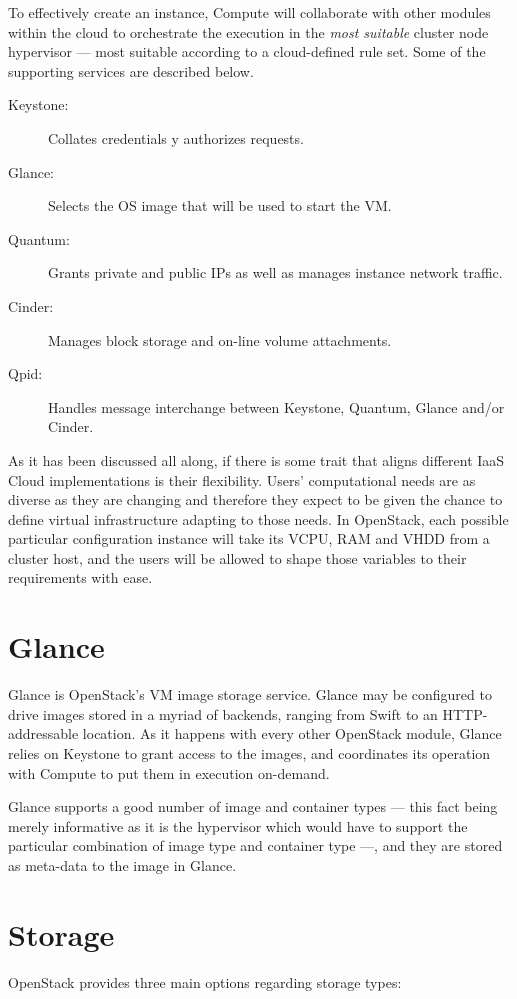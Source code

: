 To effectively create an instance, Compute will collaborate with other modules within the cloud to orchestrate the execution in the \emph{most suitable} cluster node hypervisor --- most suitable according to a cloud-defined rule set. Some of the supporting services are described below.

\begin{description}
 \item[Keystone:] Collates credentials y authorizes requests.
 \item[Glance:] Selects the OS image that will be used to start the VM.
 \item[Quantum:] Grants private and public IPs as well as manages instance network traffic.
 \item[Cinder:] Manages block storage and on-line volume attachments.
 \item[Qpid:] Handles message interchange between Keystone, Quantum, Glance and/or Cinder.
\end{description}

As it has been discussed all along, if there is some trait that aligns different IaaS Cloud implementations is their flexibility. Users' computational needs are as diverse as they are changing and therefore they expect to be given the chance to define virtual infrastructure adapting to those needs. In OpenStack, each possible particular configuration instance will take its VCPU, RAM and VHDD from a cluster host, and the users will be allowed to shape those variables to their requirements with ease.

\section{Glance}\label{sec:glance}
\noindent Glance is OpenStack's VM image storage service. Glance may be configured to drive images stored in a myriad of backends, ranging from Swift to an HTTP-addressable location. As it happens with every other OpenStack module, Glance relies on Keystone to grant access to the images, and coordinates its operation with Compute to put them in execution on-demand.

Glance supports a good number of image and container types --- this fact being merely informative as it is the hypervisor which would have to support the particular combination of image type and container type ---, and they are stored as meta-data to the image in Glance.

\section{Storage}\label{sec:almacenamiento}
\noindent OpenStack provides three main options regarding storage types:

